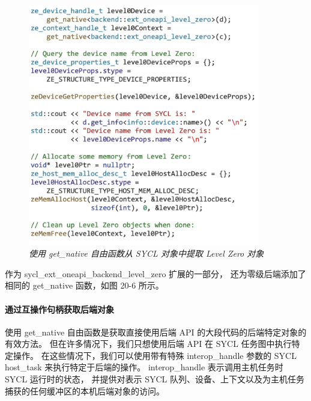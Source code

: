 \begin{figure}[H]
	\centering
	\includegraphics[width=0.9\textwidth]{figs/F20.6.png}
	\caption{\textit{使用 get\_native 自由函数从 SYCL 对象中提取 Level Zero 对象 }}
\end{figure}

作为 sycl\_ext\_oneapi\_backend\_level\_zero 扩展的一部分，
还为零级后端添加了相同的 get\_native 函数，如图 20-6 所示。

\paragraph{通过互操作句柄获取后端对象}

使用 get\_native 自由函数是获取直接使用后端 API 的大段代码的后端特定对象的有效方法。 
但在许多情况下，我们只想使用后端 API 在 SYCL 任务图中执行特定操作。 
在这些情况下，我们可以使用带有特殊 interop\_handle 参数的 SYCL host\_task 来执行特定于后端的操作。 
interop\_handle 表示调用主机任务时 SYCL 运行时的状态，
并提供对表示 SYCL 队列、设备、上下文以及为主机任务捕获的任何缓冲区的本机后端对象的访问。

